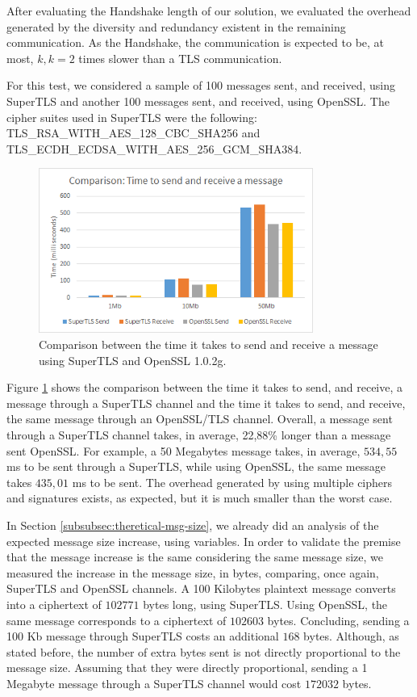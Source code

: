 \documentclass{sig-alternate-05-2015}
\begin{document}
After evaluating the Handshake length of our solution, we evaluated the overhead generated by the diversity and redundancy existent in the remaining communication. As the Handshake, the communication is expected to be, at most, $k, k = 2$ times slower than a TLS communication.

For this test, we considered a sample of 100 messages sent, and received, using SuperTLS and another 100 messages sent, and received, using OpenSSL. The cipher suites used in SuperTLS were the following:\\TLS\_RSA\_WITH\_AES\_128\_CBC\_SHA256 and\\
TLS\_ECDH\_ECDSA\_WITH\_AES\_256\_GCM\_SHA384.

\begin{figure}[t]
\includegraphics[width=9cm]{eval_time_2}
\centering
\caption{Comparison between the time it takes to send and receive a message using SuperTLS and OpenSSL 1.0.2g.}
\label{fig:eval_time_2}
\end{figure}

Figure \ref{fig:eval_time_2} shows the comparison between the time it takes to send, and receive, a message through a SuperTLS channel and the time it takes to send, and receive, the same message through an OpenSSL/TLS channel. Overall, a message sent through a SuperTLS channel takes, in average, 22,88\% longer than a message sent OpenSSL. For example, a 50 Megabytes message takes, in average, $534,55$ ms to be sent through a SuperTLS, while using OpenSSL, the same message takes $435,01$ ms to be sent.
The overhead generated by using multiple ciphers and signatures exists, as expected, but it is much smaller than the worst case.

In Section \ref{subsubsec:theretical-msg-size}, we already did an analysis of the expected message size increase, using variables. In order to validate the premise that the message increase is the same considering the same message size, we measured the increase in the message size, in bytes, comparing, once again, SuperTLS and OpenSSL channels.
A 100 Kilobytes plaintext message converts into a ciphertext of $102 771$ bytes long, using SuperTLS. Using OpenSSL, the same message corresponds to a ciphertext of $102 603$ bytes. Concluding, sending a 100 Kb message through SuperTLS costs an additional $168$ bytes. Although, as stated before, the number of extra bytes sent is not directly proportional to the message size. Assuming that they were directly proportional, sending a 1 Megabyte message through a SuperTLS channel would cost $172 032$ bytes.
\end{document}

